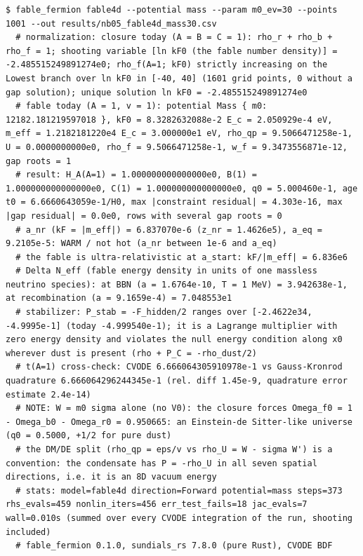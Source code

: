\begin{Verbatim}
$ fable_fermion fable4d --potential mass --param m0_ev=30 --points 1001 --out results/nb05_fable4d_mass30.csv
  # normalization: closure today (A = B = C = 1): rho_r + rho_b + rho_f = 1; shooting variable [ln kF0 (the fable number density)] = -2.485515249891274e0; rho_f(A=1; kF0) strictly increasing on the Lowest branch over ln kF0 in [-40, 40] (1601 grid points, 0 without a gap solution); unique solution ln kF0 = -2.485515249891274e0
  # fable today (A = 1, v = 1): potential Mass { m0: 12182.181219597018 }, kF0 = 8.3282632088e-2 E_c = 2.050929e-4 eV, m_eff = 1.2182181220e4 E_c = 3.000000e1 eV, rho_qp = 9.5066471258e-1, U = 0.0000000000e0, rho_f = 9.5066471258e-1, w_f = 9.3473556871e-12, gap roots = 1
  # result: H_A(A=1) = 1.000000000000000e0, B(1) = 1.000000000000000e0, C(1) = 1.000000000000000e0, q0 = 5.000460e-1, age t0 = 6.6660643059e-1/H0, max |constraint residual| = 4.303e-16, max |gap residual| = 0.0e0, rows with several gap roots = 0
  # a_nr (kF = |m_eff|) = 6.837070e-6 (z_nr = 1.4626e5), a_eq = 9.2105e-5: WARM / not hot (a_nr between 1e-6 and a_eq)
  # the fable is ultra-relativistic at a_start: kF/|m_eff| = 6.836e6
  # Delta N_eff (fable energy density in units of one massless neutrino species): at BBN (a = 1.6764e-10, T = 1 MeV) = 3.942638e-1, at recombination (a = 9.1659e-4) = 7.048553e1
  # stabilizer: P_stab = -F_hidden/2 ranges over [-2.4622e34, -4.9995e-1] (today -4.999540e-1); it is a Lagrange multiplier with zero energy density and violates the null energy condition along x0 wherever dust is present (rho + P_C = -rho_dust/2)
  # t(A=1) cross-check: CVODE 6.666064305910978e-1 vs Gauss-Kronrod quadrature 6.666064296244345e-1 (rel. diff 1.45e-9, quadrature error estimate 2.4e-14)
  # NOTE: W = m0 sigma alone (no V0): the closure forces Omega_f0 = 1 - Omega_b0 - Omega_r0 = 0.950665: an Einstein-de Sitter-like universe (q0 = 0.5000, +1/2 for pure dust)
  # the DM/DE split (rho_qp = eps/v vs rho_U = W - sigma W') is a convention: the condensate has P = -rho_U in all seven spatial directions, i.e. it is an 8D vacuum energy
  # stats: model=fable4d direction=Forward potential=mass steps=373 rhs_evals=459 nonlin_iters=456 err_test_fails=18 jac_evals=7 wall=0.010s (summed over every CVODE integration of the run, shooting included)
  # fable_fermion 0.1.0, sundials_rs 7.8.0 (pure Rust), CVODE BDF
\end{Verbatim}

